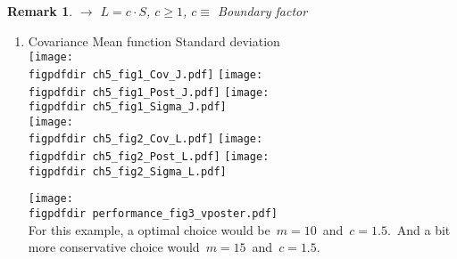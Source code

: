 \documentclass[landscape,a1,final]{a0poster} %
\newtheorem*{remark}{Remark}
\def\figpdfdir{fig/} %
\begin{document}
\begin{minipage}{1\linewidth}
\begin{minipage}[t]{0.31\textwidth}
\vspace{0.2cm}
\begin{remark}
\;\;  $\to$\;\;  $L=c \cdot S$, \hspace{3mm} $c \geqslant 1$, \hspace{1mm} $c \equiv$ {\color{navyblue} Boundary factor}
\end{remark}
\vspace{0.2cm}

\begin{enumerate}
\item {}

\vspace{-2mm}
\hspace{-1cm}
\begin{minipage}{0.70\textwidth}
{\scriptsize \hspace{20mm} Covariance \hspace{35mm} Mean function \hspace{25mm} Standard deviation}\\[-6mm]
%
\texttt{[image: \\figpdfdir ch5\_fig1\_Cov\_J.pdf]}
\texttt{[image: \\figpdfdir ch5\_fig1\_Post\_J.pdf]}
\texttt{[image: \\figpdfdir ch5\_fig1\_Sigma\_J.pdf]}\\
\texttt{[image: \\figpdfdir ch5\_fig2\_Cov\_L.pdf]}
\texttt{[image: \\figpdfdir ch5\_fig2\_Post\_L.pdf]}
\texttt{[image: \\figpdfdir ch5\_fig2\_Sigma\_L.pdf]}

\end{minipage}
\begin{minipage}{0.29\textwidth}

\texttt{[image: \\figpdfdir performance\_fig3\_vposter.pdf]}\\
For this example, a optimal choice would be\, $m=10$\, and\, $c=1.5$.\, And a bit more conservative choice would\, $m=15$\, and\, $c=1.5$.\\
\end{minipage}


\end{enumerate}
\end{minipage}
\end{minipage}
\end{document}
